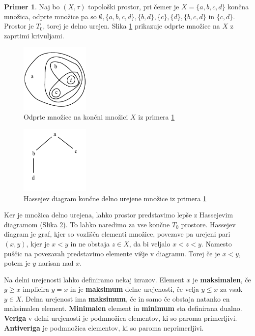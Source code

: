 \documentclass[a4paper, 12pt]{book}
\theoremstyle{definition}
\newtheorem{example}{Primer}[section]
\begin{document}
\begin{example}\label{ex1}
    Naj bo $(X,\tau)$ topološki prostor, pri čemer je $X = \{a,b,c,d\}$ končna
    množica, odprte množice pa so $\emptyset, \{a,b,c,d\}, \{b,d\}, \{c\}, \{d\},
    \{b,c,d\}$ in $\{c,d\}$. Prostor je $T_0$, torej je delno urejen. Slika \ref{pic1}
    prikazuje odprte množice na $X$ z zaprtimi krivuljami.
    \begin{figure}[h]
      \label{pic1}
        \begin{center}
        \includegraphics[width=0.3\textwidth]{example-topology.pdf}
        \end{center}
        \caption{Odprte množice na končni množici $X$ iz primera \ref{ex1}}
    \end{figure}
    \begin{figure}[h]
        \begin{center}
        \includegraphics[width=0.3\textwidth]{hasse-example.pdf}
        \end{center}
        \caption{Hassejev diagram končne delno urejene množice iz primera \ref{ex1}}
        \label{pic2}
    \end{figure}
    Ker je množica delno urejena, lahko prostor predstavimo lepše z Hassejevim diagramom (Slika \ref{pic2}).
    To lahko naredimo za vse končne $T_0$ prostore. Hassejev diagram je graf,
    kjer so vozlišča elementi množice, povezave pa urejeni pari $(x,y)$, kjer je $x < y$ in
    ne obstaja $z \in X$, da bi veljalo $x < z < y$. Namesto puščic na povezavah
    predstavimo elemente višje v diagramu. Torej če je $x < y$, potem je $y$
    narisan nad $x$.

\end{example}
Na delni urejenosti lahko definiramo nekaj izrazov. Element $x$ je \textbf{maksimalen},
če $y \geq x$ implicira $y=x$ in je \textbf{maksimum} delne urejenosti, če velja
$y \leq x$ za vsak $y \in X$. Delna urejenost ima \textbf{maksimum}, če in samo če
obstaja natanko en maksimalen element. \textbf{Minimalen} element in \textbf{minimum} sta
definirana dualno.\\
\textbf{Veriga} v delni urejenosti je podmnožica elementov, ki so paroma primerljivi.
\textbf{Antiveriga} je podmnožica elementov, ki so paroma neprimerljivi.\\
\end{document}
